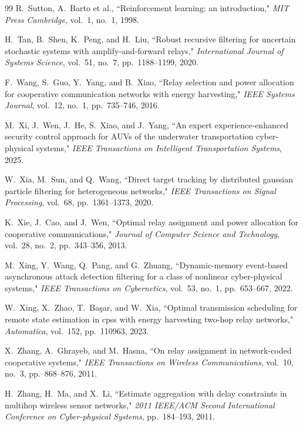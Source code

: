 \documentclass[twocolumn]{IEEEtran}
\begin{document}
\begin{thebibliography}{99}
R.~Sutton, A.~Barto et al., ``Reinforcement learning: an introduction," \textit{MIT Press Cambridge}, vol.~1, no.~1, 1998.

H.~Tan, B.~Shen, K.~Peng, and H.~Liu, ``Robust recursive filtering for uncertain stochastic systems with amplify-and-forward relays," \textit{International Journal of Systems Science}, vol.~51, no.~7, pp.~1188--1199, 2020.

F.~Wang, S.~Guo, Y.~Yang, and B.~Xiao, ``Relay selection and power allocation for cooperative communication networks with energy harvesting," \textit{IEEE Systems Journal}, vol.~12, no.~1, pp.~735--746, 2016.

M.~Xi, J.~Wen, J.~He, S.~Xiao, and J.~Yang, ``An expert experience-enhanced security control approach for AUVs of the underwater transportation cyber-physical systems," \textit{IEEE Transactions on Intelligent Transportation Systems}, 2025.

W.~Xia, M.~Sun, and Q.~Wang, ``Direct target tracking by distributed gaussian particle filtering for heterogeneous networks," \textit{IEEE Transactions on Signal Processing}, vol.~68, pp.~1361--1373, 2020.

K.~Xie, J.~Cao, and J.~Wen, ``Optimal relay assignment and power allocation for cooperative communications," \textit{Journal of Computer Science and Technology}, vol.~28, no.~2, pp.~343--356, 2013.

M.~Xing, Y.~Wang, Q.~Pang, and G.~Zhuang, ``Dynamic-memory event-based asynchronous attack detection filtering for a class of nonlinear cyber-physical systems," \textit{IEEE Transactions on Cybernetics}, vol.~53, no.~1, pp.~653--667, 2022.

W.~Xing, X.~Zhao, T.~Ba{\c{s}}ar, and W.~Xia, ``Optimal transmission scheduling for remote state estimation in cpss with energy harvesting two-hop relay networks," \textit{Automatica}, vol.~152, pp.~110963, 2023.

X.~Zhang, A.~Ghrayeb, and M.~Hasna, ``On relay assignment in network-coded cooperative systems," \textit{IEEE Transactions on Wireless Communications}, vol.~10, no.~3, pp.~868--876, 2011.

H.~Zhang, H.~Ma, and X.~Li, ``Estimate aggregation with delay constraints in multihop wireless sensor networks," \textit{2011 IEEE/ACM Second International Conference on Cyber-physical Systems}, pp.~184--193, 2011.


\end{thebibliography}
\end{document}

